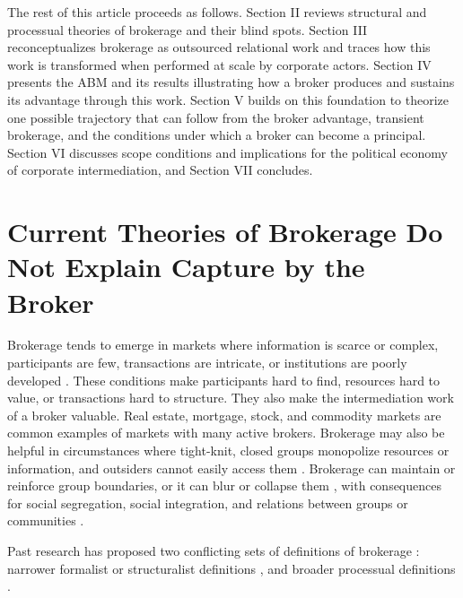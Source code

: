 \documentclass[
]{article}
\begin{document}
The rest of this article proceeds as follows. Section II reviews structural and processual theories of brokerage and their blind spots. Section III reconceptualizes brokerage as outsourced relational work and traces how this work is transformed when performed at scale by corporate actors. Section IV presents the ABM and its results illustrating how a broker produces and sustains its advantage through this work. Section V builds on this foundation to theorize one possible trajectory that can follow from the broker advantage, transient brokerage, and the conditions under which a broker can become a principal. Section VI discusses scope conditions and implications for the political economy of corporate intermediation, and Section VII concludes.

\section{Current Theories of Brokerage Do Not Explain Capture by the Broker}
\label{sec:brokerage-theory}

Brokerage tends to emerge in markets where information is scarce or complex, participants are few, transactions are intricate, or institutions are poorly developed \autocite{stovelStabilizingBrokerage2011}. These conditions make participants hard to find, resources hard to value, or transactions hard to structure. They also make the intermediation work of a broker valuable. Real estate, mortgage, stock, and commodity markets are common examples of markets with many active brokers. Brokerage may also be helpful in circumstances where tight-knit, closed groups monopolize resources or information, and outsiders cannot easily access them \autocite[140]{stovelBrokerage2012}. Brokerage can maintain or reinforce group boundaries, or it can blur or collapse them \autocite{stovelBrokerage2012}, with consequences for social segregation, social integration, and relations between groups or communities \autocite{galsterWordsDeedsRacial2005}.

Past research has proposed two conflicting sets of definitions of brokerage \autocite[see][for a review]{eriksonFormalistRelationalistTheory2013}: narrower formalist or structuralist definitions \autocite{burtStructuralHolesSocial1992,gouldStructuresMediationFormal1989,granovetterStrengthWeakTies1973,marsdenBrokerageBehaviorRestricted1982}, and broader processual definitions \autocite{obstfeldBrokerageProcessDecoupling2014,rossmanObfuscatoryRelationalWork2014,spiroExtendedStructuresMediation2013,stovelBrokerage2012}.
\end{document}

